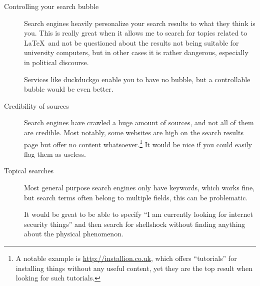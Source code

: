 \documentclass[12pt,a4paper]{article}
\begin{document}
\begin{description}
\item[Controlling your search bubble] Search engines heavily personalize your search results to what they think is you. This is really great when it allows me to search for topics related to \LaTeX~and  not be questioned about the results  not being suitable for university computers, but in other cases it is rather dangerous, especially in political discourse.

Services like duckduckgo enable you to have no bubble, but a controllable bubble would be even better.

\item[Credibility of sources] Search engines have crawled a huge amount of sources, and not all of them are credible. Most notably, some websites are high on the search results page but offer no content whatsoever.\footnote{A notable example is \url{http://installion.co.uk}, which offers ``tutorials'' for installing things without any useful content, yet they are the top result when looking for such tutorials.} It would be nice if you could easily flag them as useless.

\item[Topical searches] Most general purpose search engines only have keywords, which works fine, but search terms often belong to multiple fields, this can be problematic.

It would be great to be able to specify ``I am currently looking for internet security things'' and then search for shellshock without finding anything about the physical phenomenon.
\end{description}
\end{document}

